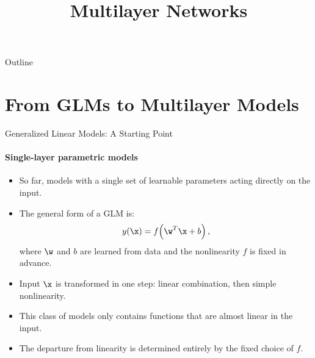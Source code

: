 


%
%


\title[Multilayer Networks]{Multilayer Networks}
%
%

\begin{frame}
  \titlepage
\end{frame}

\begin{frame}{Outline}
  \tableofcontents
\end{frame}

\section{From GLMs to Multilayer Models}

\begin{frame}{Generalized Linear Models: A Starting Point}
  \framesubtitle{Single-layer parametric models}
  \begin{itemize}
    \item So far, models with a \alert{single set of learnable parameters} acting directly on the input.
    \item The general form of a GLM is:
    \[
      y(\x) = f\!\left(\w^T\x + b\right),
    \]
    where $\w$ and $b$ are learned from data and the nonlinearity $f$ is \alert{fixed in advance}.
    \item Input $\x$ is transformed in one step: linear combination, then simple nonlinearity.
    \item This class of models only contains functions that are \alert{almost linear} in the input.
    \item The departure from linearity is determined entirely by the fixed choice of $f$.
  \end{itemize}
\end{frame}

